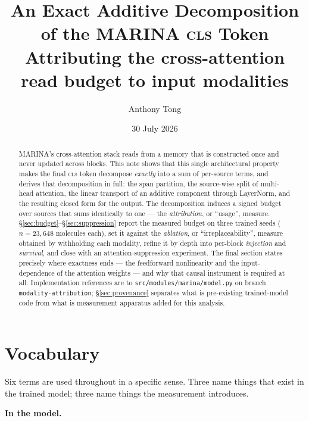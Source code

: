 \documentclass[11pt]{article}
\title{\textbf{An Exact Additive Decomposition of the MARINA \textsc{cls} Token}\\[0.4em]
\large Attributing the cross-attention read budget to input modalities}
\author{Anthony Tong}
\date{30 July 2026}
\theoremstyle{plain}
\theoremstyle{remark}
\newcommand{\code}[1]{\texttt{\small #1}}
\begin{document}
\maketitle

\begin{abstract}
\noindent
MARINA's cross-attention stack reads from a memory that is constructed once and
never updated across blocks. This note shows that this single architectural
property makes the final \textsc{cls} token decompose \emph{exactly} into a sum
of per-source terms, and derives that decomposition in full: the span partition,
the source-wise split of multi-head attention, the linear transport of an
additive component through LayerNorm, and the resulting closed form for the
output. The decomposition induces a signed budget over sources that sums
identically to one --- the \emph{attribution}, or ``usage'', measure.
\S\ref{sec:budget}--\S\ref{sec:suppression} report the measured budget on three
trained seeds
($n = 23{,}648$ molecules each), set it against the \emph{ablation}, or
``irreplaceability'', measure obtained by withholding each modality, refine it
by depth into per-block \emph{injection} and \emph{survival}, and close with an
attention-suppression experiment. The final section states precisely where
exactness ends --- the feedforward nonlinearity and the input-dependence of the
attention weights --- and why that causal instrument is required at all.
Implementation references are to \code{src/modules/marina/model.py} on branch
\code{modality-attribution}; \S\ref{sec:provenance} separates what is
pre-existing trained-model code from what is measurement apparatus added for
this analysis.
\end{abstract}

\newpage
\setcounter{tocdepth}{2}
{\parskip 0pt \tableofcontents}
\newpage

\section{Vocabulary}
\label{sec:vocab}

Six terms are used throughout in a specific sense. Three name things that exist
in the trained model; three name things the measurement introduces.

\medskip
\noindent\textbf{In the model.}
\end{document}
